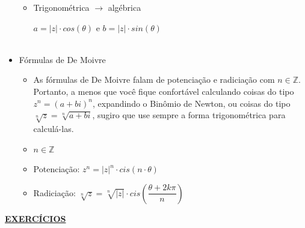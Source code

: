 \documentclass[a4paper, 11pt]{article}
\begin{document}
\begin{itemize}
\begin{itemize}
\item Trigonométrica $\longrightarrow$ algébrica

$ a = |z| \cdot cos(\theta) $ e $ b = |z| \cdot sin(\theta) $
\\
\\
	
	\end{itemize}


\item Fórmulas de De Moivre

	\begin{itemize}

\item As fórmulas de De Moivre falam de potenciação e radiciação com $n \in \mathbb{Z}$. Portanto, a menos que você fique confortável calculando coisas do tipo $z^n = (a + bi)^n$, expandindo o Binômio de Newton, ou coisas do tipo $\sqrt[n]{z} = \sqrt[n]{a + bi}$, sugiro que use sempre a forma trigonométrica para calculá-las.

\item $n \in \mathbb{Z}$

\item Potenciação: $ z^n = |z|^n \cdot cis(n\cdot\theta)$

\item Radiciação: $ \sqrt[n]{z} = \sqrt[n]{|z|} \cdot cis( \dfrac{\theta + 2k\pi}{n} ) $
\\
	\end{itemize}
\end{itemize}


\begin{center}
\textbf{\underline{EXERCÍCIOS}}
\end{center}
\end{document}
